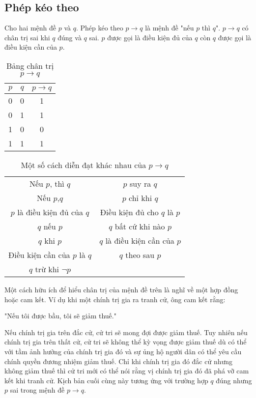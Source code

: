 \documentclass[11pt,fleqn]{book} %
\begin{document}
    \subsection{Phép kéo theo} 
        \begin{definition}
            Cho hai mệnh đề $p$ và $q$. Phép kéo theo $p \to q$ là mệnh đề "nếu $p$ thì $q$". $p \to q$ có chân trị sai khi $q$ đúng và $q$ sai. $p$ được gọi là điều kiện đủ của $q$ còn $q$ được gọi là điều kiện cần của $p$.
        \end{definition}
        \begin{table}[h!]
            \centering
            \setlength{\tabcolsep}{18pt}
            \begin{tabular}{c c c}
                $p$ & $q$ & $p \to q$ \\ \hline
                0 & 0 & 1\\
                0 & 1 & 1\\ 
                1 & 0 & 0\\
                1 & 1 & 1
            \end{tabular}
            \caption{Bảng chân trị $p \to q$}
        \end{table}
        
        \begin{table}[h!]
            \centering
            \setlength{\tabcolsep}{20pt}
            \caption{Một số cách diễn đạt khác nhau của $p \to q$}
            \begin{tabular}{c|c}
                \hline
                Nếu $p$, thì $q$ & $p$ suy ra $q$\\
                Nếu $p$,$q$ & $p$ chỉ khi $q$ \\
                $p$ là điều kiện đủ của $q$ & Điều kiện đủ cho $q$ là $p$\\
                $q$ nếu $p$ & $q$ bất cứ khi nào $p$\\
                $q$ khi $p$ & $q$ là điều kiện cần của $p$\\
                Điều kiện cần của $p$ là $q$ & $q$ theo sau $p$\\
                $q$ trừ khi $\neg p$ &
            \end{tabular}
        \end{table}
        
        Một cách hữu ích để hiểu chân trị của mệnh đề trên là nghĩ về một hợp đồng hoặc cam kết. Ví dụ khi một chính trị gia ra tranh cử, ông cam kết rằng:
        \begin{center}
            "Nếu tôi được bầu, tôi sẽ giảm thuế."\\
        \end{center}
        Nếu chính trị gia trên đắc cử, cử tri sẽ mong đợi được giảm thuế. Tuy nhiên nếu chính trị gia trên thất cử, cử tri sẽ không thể kỳ vọng được giảm thuế dù có thể với tầm ảnh hưởng của chính trị gia đó và sự ủng hộ người dân có thể yêu cầu chính quyền đương nhiệm giảm thuế. Chỉ khi chính trị gia đó đắc cử nhưng không giảm thuế thì cử tri mới có thể nói rằng vị chính trị gia đó đã phá vỡ cam kết khi tranh cử. Kịch bản cuối cùng này tương ứng với trường hợp $q$ đúng nhưng $p$ sai trong mệnh đề $p \to q$.
        
\end{document}
